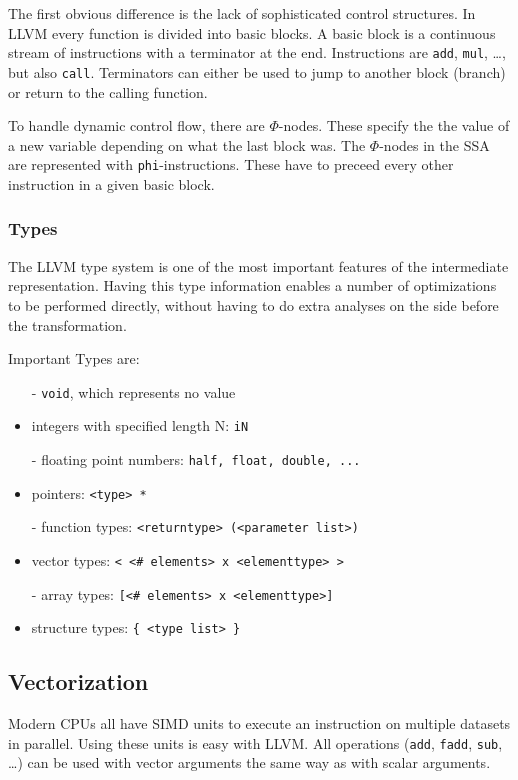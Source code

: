 \documentclass[a4paper,bibliography=totocnumbered,parskip,headsepline]{scrbook}
\begin{document}
The first obvious difference is the lack of sophisticated control structures.
In LLVM every function is divided into basic blocks.
A basic block is a continuous stream of instructions with a terminator at the end.
Instructions are \lstinline!add!, \lstinline!mul!, \dots, but also \lstinline!call!.
Terminators can either be used to jump to another block (branch) or return to the calling function.

To handle dynamic control flow, there are $\Phi$-nodes.
These specify the the value of a new variable depending on what the last block was.
The $\Phi$-nodes in the SSA are represented with \lstinline{phi}-instructions.
These have to preceed every other instruction in a given basic block.

\subsubsection{Types}
The LLVM type system is one of the most important features of the intermediate representation.
Having this type information enables a number of optimizations to be performed directly, without having to do extra analyses on the side before the transformation.

\begin{samepage}
Important Types are:
\begin{itemize}[noitemsep]
\item[-] \lstinline{void}, which represents no value
\item[-] integers with specified length N: \lstinline[morekeywords={iN}]{iN}
\item[-] floating point numbers: \lstinline{half, float, double, ...}
\item[-] pointers: \lstinline{<type> *}
\item[-] function types: \lstinline{<returntype> (<parameter list>)}
\item[-] vector types: \lstinline{< <# elements> x <elementtype> >}
\item[-] array types: \lstinline{[<# elements> x <elementtype>]}
\item[-] structure types: \lstinline!{ <type list> }!
\end{itemize}
\end{samepage}

\subsection{Vectorization}
Modern CPUs all have SIMD units to execute an instruction on multiple datasets in parallel.
Using these units is easy with LLVM.
All operations (\lstinline{add}, \lstinline{fadd}, \lstinline{sub}, \dots) can be used with vector arguments the same way as with scalar arguments.
\end{document}
